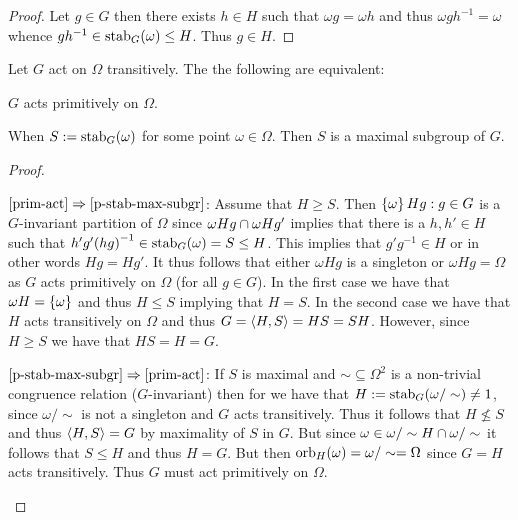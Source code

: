 \documentclass[8pt,a4paper]{article}
\begin{document}
\begin{proof}
    Let $g\in G$ then there exists $h\in H$ such that $\omega g=\omega h$ and thus $\omega gh^{-1}=\omega$ whence $gh^{-1}\in\stab[G](\omega)\leq H$. Thus $g\in H$.
\end{proof}
    

\begin{lemma}\label{or-stab-ff-trans} Let $G$ act on $\Omega$ transitively.
    The the following are equivalent:
    \begin{statements}
            \item\label{prim-act} $G$ acts primitively on $\Omega$.
            \item\label{p-stab-max-subgr} When $S:=\stab[G](\omega)$ for some point $\omega\in\Omega$. Then $S$ is a maximal subgroup of $G$.
    \end{statements}
\end{lemma}

\begin{proof}
    \begin{implications}
        \item[$\ref{prim-act}\implies\ref{p-stab-max-subgr}$:]
    Assume that $H\geq S$. Then $\set{\omega Hg:g\in G}$ is a $G$-invariant partition of $\Omega$ since $\omega Hg\setmeet \omega Hg'$ implies that there is a $h,h'\in H$ such that $h'g'{(hg)}^{-1}\in \stab[G](\omega)=S\leq H$. This implies that $g'g^{-1}\in H$ or in other words $Hg=Hg'$. It thus follows that either $\omega Hg$ is a singleton or $\omega Hg=\Omega$ as $G$ acts primitively on $\Omega$ (for all $g\in G$).
    In the first case we have that $\omega H=\set{\omega}$ and thus $H\leq S$ implying that $H=S$.
    In the second case we have that $H$ acts transitively on $\Omega$ and thus $G=\gen{H,S}=HS=SH$.
    However, since $H\geq S$ we have that $HS=H=G$.
        \item[$\ref{p-stab-max-subgr}\implies\ref{prim-act}$:]
    If $S$ is maximal and $\sim\subseteq \Omega^2$ is a non-trivial congruence relation ($G$-invariant) then for we have that $H:=\stab[G](\omega/\sim)\neq 1$, since $\omega/\sim$ is not a singleton and $G$ acts transitively. Thus it follows that $H\not\leq S$ and thus $\gen{H,S}=G$ by maximality of $S$ in $G$.
    But since $\omega\in\omega/\sim H\setmeet \omega/\sim$ it follows that $S\leq H$ and thus $H=G$. But then $\orb[H](\omega)=\omega/\sim = \Omega$ since $G=H$ acts transitively. Thus $G$ must act primitively on $\Omega$. 
\end{implications}
\end{proof}
\end{document}

